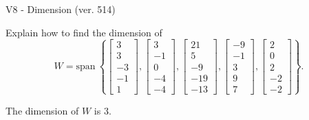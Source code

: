 \begin{exercise}
  \begin{exerciseTitle}V8 - Dimension (ver. 514)\end{exerciseTitle}
  \begin{exerciseStatement}
    Explain how to find the dimension of 
\[W=\mathrm{span}\ \left\{\left[\begin{array}{r}
3 \\
3 \\
-3 \\
-1 \\
1
\end{array}\right] , \left[\begin{array}{r}
3 \\
-1 \\
0 \\
-4 \\
-4
\end{array}\right] , \left[\begin{array}{r}
21 \\
5 \\
-9 \\
-19 \\
-13
\end{array}\right] , \left[\begin{array}{r}
-9 \\
-1 \\
3 \\
9 \\
7
\end{array}\right] , \left[\begin{array}{r}
2 \\
0 \\
2 \\
-2 \\
-2
\end{array}\right]\right\}.\]



  \end{exerciseStatement}
  \begin{exerciseAnswer}
   The dimension of \(W\) is  \(3\).
  


  \end{exerciseAnswer}
\end{exercise}
